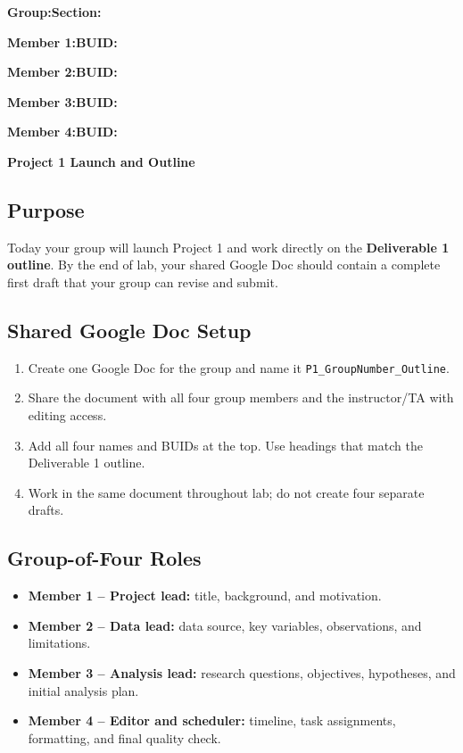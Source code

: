 \documentclass{article}
\newcommand{\projecttitle}{Project 1 Launch and Outline}
\newcommand{\blankline}{\underline{\phantom{XXXXXXXXXXXXXXXXXXXXXXXX}}}
\newcommand{\blankid}{\underline{\phantom{XXXXXXXXXXXXXXX}}}
\begin{document}
\noindent\textbf{Group:}\blankline{}\hfill\textbf{Section:}\blankid{}

\medskip
\noindent\textbf{Member 1:}\blankline{}\hfill\textbf{BUID:}\blankid{}

\medskip
\noindent\textbf{Member 2:}\blankline{}\hfill\textbf{BUID:}\blankid{}

\medskip
\noindent\textbf{Member 3:}\blankline{}\hfill\textbf{BUID:}\blankid{}

\medskip
\noindent\textbf{Member 4:}\blankline{}\hfill\textbf{BUID:}\blankid{}

\begin{center}
  {\Large \textbf{\projecttitle{}}}
\end{center}

\subsection*{Purpose}
Today your group will launch Project 1 and work directly on the \textbf{Deliverable 1 outline}. By the end of lab, your shared Google Doc should contain a complete first draft that your group can revise and submit.

\subsection*{Shared Google Doc Setup}
\begin{enumerate}[itemsep=.25em]
  \item Create one Google Doc for the group and name it \texttt{P1\_GroupNumber\_Outline}.
  \item Share the document with all four group members and the instructor/TA with editing access.
  \item Add all four names and BUIDs at the top. Use headings that match the Deliverable 1 outline.
  \item Work in the same document throughout lab; do not create four separate drafts.
\end{enumerate}

\subsection*{Group-of-Four Roles}
\begin{itemize}[itemsep=.25em]
  \item \textbf{Member 1 -- Project lead:} title, background, and motivation.
  \item \textbf{Member 2 -- Data lead:} data source, key variables, observations, and limitations.
  \item \textbf{Member 3 -- Analysis lead:} research questions, objectives, hypotheses, and initial analysis plan.
  \item \textbf{Member 4 -- Editor and scheduler:} timeline, task assignments, formatting, and final quality check.
\end{itemize}
\end{document}
